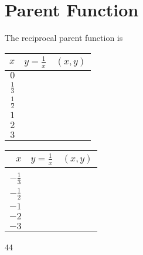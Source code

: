 \section{Parent Function}

The reciprocal parent function is 
\vspace{-0.5\onelineskip}
\myCenteredBox[width=1.75in,valign=center]{
    \large
    \vspace{-1.2em}
    \[ f(x) = \frac{1}{x} \]
}

{
\renewcommand{\arraystretch}{1.5}
\begin{tcbraster}[
    raster columns = 3,
    raster equal height,
    colback=white,
    ]
    \begin{tcolorbox}
        \small
        \begin{tabular}{r|p{0.75in}|c}
            $x$ 
                & $y = \frac{1}{x}$    
                & $(x,y)$\\ \hline\hline
            $0$ 
                &      
                & \\ \hline
            $\frac{1}{3}$ 
                & 
                & \\ \hline
            $\frac{1}{2}$ 
                & 
                & \\ \hline
            $1$ 
                & 
                & \\ \hline
            $2$ 
                & 
                & \\ \hline
            $3$ 
                & 
                & \\ \hline
        \end{tabular}
    \end{tcolorbox}
    \begin{tcolorbox}
        \small
        \begin{tabular}{r|p{0.75in}|c}
            $x$ 
                & $y = \frac{1}{x}$    
                & $(x,y)$\\ \hline\hline
            &&\\ \hline
            $-\frac{1}{3}$ 
                & 
                & \\ \hline
            $-\frac{1}{2}$ 
                & 
                & \\ \hline
            $-1$ 
                & 
                & \\ \hline
            $-2$ 
                & 
                & \\ \hline
            $-3$ 
                & 
                & \\ \hline
        \end{tabular}
    \end{tcolorbox}
    \begin{tcolorbox}
        \begin{myTikzpictureGrid}{0.5} {4}{4}
        \end{myTikzpictureGrid}
    \end{tcolorbox}
\end{tcbraster}
}
